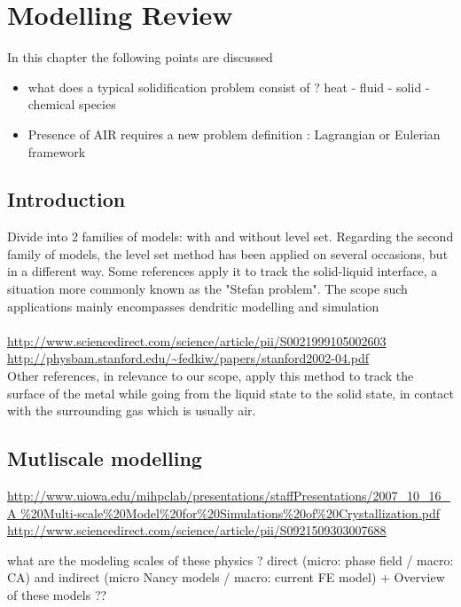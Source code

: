 \chapter{Modelling Review}
\minitoc
\newpage

In this chapter the following points are discussed
\begin{itemize}
\item what does a typical solidification problem consist of ? heat - fluid - solid 
- chemical species
\item Presence of AIR requires a new problem definition : Lagrangian or Eulerian framework
\end{itemize}

\section{Introduction}
Divide into 2 families of models: with and without level set. Regarding the second family of models,
the level set method has been applied on several occasions, but in a different way. Some references
apply it to track the solid-liquid interface, a situation more commonly known as the "Stefan problem".
The scope such applications mainly encompasses dendritic modelling and simulation \\
 \\
\url{http://www.sciencedirect.com/science/article/pii/S0021999105002603} \\
\url{http://physbam.stanford.edu/~fedkiw/papers/stanford2002-04.pdf} \\
Other references, in relevance to our scope, apply this method to track the surface of the metal
while going from the liquid state to the solid state, in contact with the surrounding gas which is usually air. \\

\section{Mutliscale modelling}
\url{http://www.uiowa.edu/mihpclab/presentations/staffPresentations/2007_10_16_A
} \\

\url{http://www.sciencedirect.com/science/article/pii/S0921509303007688}

what are the modeling scales of these physics ? direct (micro: phase field / macro: CA) 
and indirect (micro Nancy models / macro: current FE model) + Overview of these models ??


